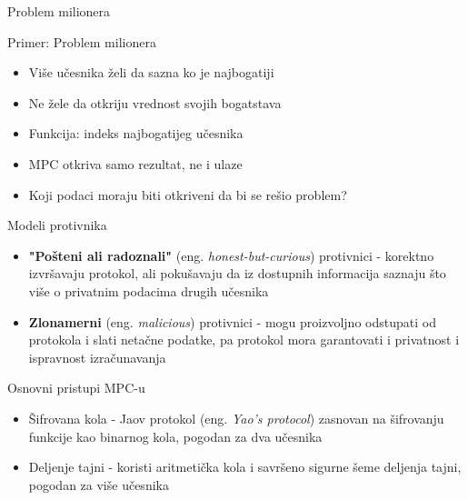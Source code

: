 \documentclass[aspectratio=1610]{beamer}
\begin{document}
\begin{frame}{Problem milionera}

\begin{pblock}{Primer: Problem milionera}
    \begin{itemize}
        \item Više učesnika želi da sazna ko je najbogatiji
        \item Ne žele da otkriju vrednost svojih bogatstava
        \item Funkcija: indeks najbogatijeg učesnika
        \item MPC otkriva samo rezultat, ne i ulaze
        \item Koji podaci moraju biti otkriveni da bi se rešio problem?
    \end{itemize}
\end{pblock}
\end{frame}

\begin{frame}{Modeli protivnika}
    \begin{itemize}
         \item \textbf{"Pošteni ali radoznali"} (eng. \textit{honest-but-curious}) protivnici - korektno izvršavaju protokol, ali pokušavaju da iz dostupnih informacija saznaju što više o privatnim podacima drugih učesnika
         \item \textbf{Zlonamerni} (eng. \textit{malicious}) protivnici - mogu proizvoljno odstupati od protokola i slati netačne podatke, pa protokol mora garantovati i privatnost i ispravnost izračunavanja
    \end{itemize}
\end{frame}

\begin{frame}{Osnovni pristupi MPC-u}
\begin{itemize}
    \item Šifrovana kola - Jaov protokol (eng. \textit{Yao's protocol})  zasnovan na šifrovanju funkcije kao binarnog kola, pogodan za dva učesnika
    \item Deljenje tajni - koristi aritmetička kola i savršeno sigurne šeme deljenja tajni, pogodan za više učesnika
\end{itemize}

\end{frame}
\end{document}
